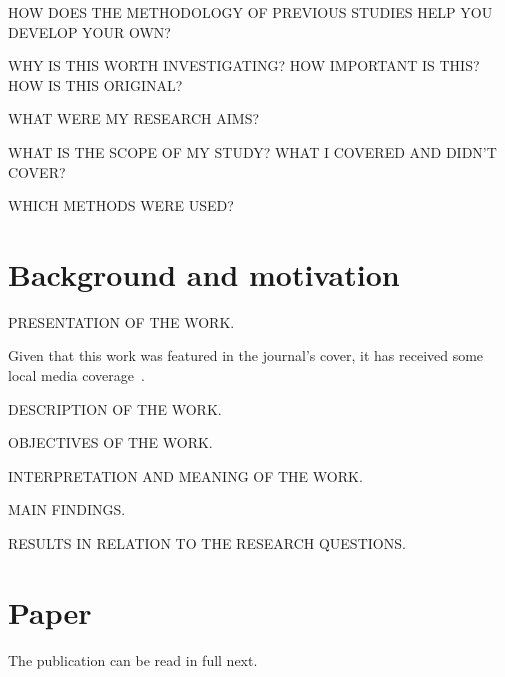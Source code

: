 HOW DOES THE METHODOLOGY OF PREVIOUS STUDIES HELP YOU DEVELOP YOUR OWN?\@

WHY IS THIS WORTH INVESTIGATING?\@
HOW IMPORTANT IS THIS?\@
HOW IS THIS ORIGINAL?\@

WHAT WERE MY RESEARCH AIMS?\@

WHAT IS THE SCOPE OF MY STUDY?\@
WHAT I COVERED AND DIDN'T COVER?\@

WHICH METHODS WERE USED?\@

\section{Background and motivation}

PRESENTATION OF THE WORK.\@

Given that this work was featured in the journal's cover, it has received some local media coverage~\cite{noticias-da-ufsc2020}.

DESCRIPTION OF THE WORK.\@

OBJECTIVES OF THE WORK.\@

INTERPRETATION AND MEANING OF THE WORK.\@

MAIN FINDINGS.\@

RESULTS IN RELATION TO THE RESEARCH QUESTIONS.\@

\section{Paper}

The publication can be read in full next.


